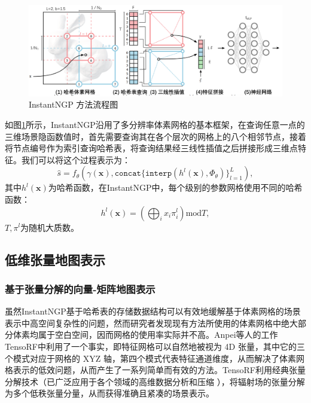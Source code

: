 \begin{figure}[ht]
    \centering
    \includegraphics[width=\textwidth]{undergraduate-thesis/images/related-work/instantngp.pdf}
    \caption{InstantNGP 方法流程图}
    \label{fig:related-work instantngp}
\end{figure}

如图\ref{fig:related-work instantngp}所示，InstantNGP沿用了多分辨率体素网格的基本框架，在查询任意一点的三维场景隐函数值时，首先需要查询其在各个层次的网格上的八个相邻节点，接着将节点编号作为索引查询哈希表，将查询结果经三线性插值之后拼接形成三维点特征。我们可以将这个过程表示为：
\begin{equation}
    \hat{s} = f_\theta(\gamma(\mathbf{x}), \mathtt{concat}\{\mathtt{interp}(h^l(\mathbf{x}), \Phi_\theta)\}_{l=1}^L),
\end{equation}
其中$h^l(\mathbf{x})$为哈希函数，在InstantNGP中，每个级别的参数网格使用不同的哈希函数：
\begin{equation}
    h^l(\mathbf{x}) = \left(\bigoplus_{i}x_i\pi_i^l\right) \text{mod} T,
\end{equation}
$T, \pi^l$为随机大质数。

\subsection{低维张量地图表示}
\label{sec: related-work multi-plane-based implicit representations}
\subsubsection{基于张量分解的向量-矩阵地图表示}
虽然InstantNGP基于哈希表的存储数据结构可以有效地缓解基于体素网格的场景表示中高空间复杂性的问题，然而研究者发现现有方法所使用的体素网格中绝大部分体素均属于空白空间，因而网格的使用率实际并不高。Anpei等人\cite{chen_tensorf_2022}的工作TensoRF中利用了一个事实，即特征网格可以自然地被视为 4D 张量，其中它的三个模式对应于网格的 XYZ 轴，第四个模式代表特征通道维度，从而解决了体素网格表示的低效问题，从而产生了一系列简单而有效的方法。TensoRF利用经典张量分解技术（已广泛应用于各个领域的高维数据分析和压缩 \cite{kolda_tensor_2009}），将辐射场的张量分解为多个低秩张量分量，从而获得准确且紧凑的场景表示。

